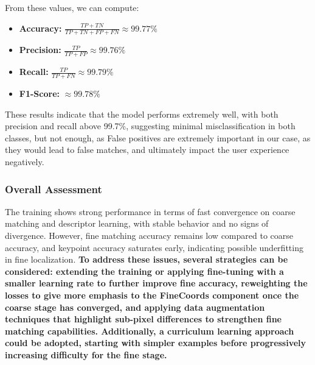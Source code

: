 From these values, we can compute:
\begin{itemize}
    \item \textbf{Accuracy:} $\frac{TP + TN}{TP + TN + FP + FN} \approx 99.77\%$
    \item \textbf{Precision:} $\frac{TP}{TP + FP} \approx 99.76\%$
    \item \textbf{Recall:} $\frac{TP}{TP + FN} \approx 99.79\%$
    \item \textbf{F1-Score:} $\approx 99.78\%$
\end{itemize}

These results indicate that the model performs extremely well, with both
precision and recall above 99.7\%, suggesting minimal misclassification in both
classes, but not enough, as False positives are extremely important in our
case, as they would lead to false matches, and ultimately impact the user
experience negatively.
\subsubsection{Overall Assessment}
The training shows strong performance in terms of fast convergence on coarse
matching and descriptor learning, with stable behavior and no signs of
divergence. However, fine matching accuracy remains low compared to coarse
accuracy, and keypoint accuracy saturates early, indicating possible
underfitting in fine localization. \textbf{To address these issues, several
    strategies can be considered: extending the training or applying fine-tuning
    with a smaller learning rate to further improve fine accuracy, reweighting the
    losses to give more emphasis to the FineCoords component once the coarse stage
    has converged, and applying data augmentation techniques that highlight
    sub-pixel differences to strengthen fine matching capabilities. Additionally, a
    curriculum learning approach could be adopted, starting with simpler examples
    before progressively increasing difficulty for the fine stage. }

